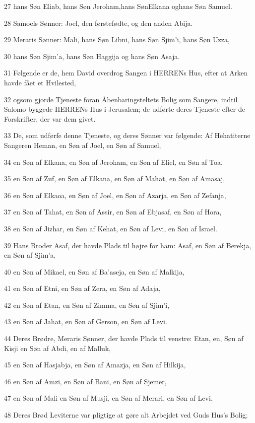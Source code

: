 \par 27 hans Søn Eliab, hans Søn Jeroham,hans SønElkana oghans Søn Samuel.
\par 28 Samoels Sønner: Joel, den førstefødte, og den anden Abija.
\par 29 Meraris Sønner: Mali, hans Søn Libni, hans Søn Sjim'i, hans Søn Uzza,
\par 30 hans Søn Sjim'a, hans Søn Haggija og hans Søn Asaja.
\par 31 Følgende er de, hem David overdrog Sangen i HERRENs Hus, efter at Arken havde fået et Hvilested,
\par 32 ogsom gjorde Tjeneste foran Åbenbaringsteltets Bolig som Sangere, indtil Salomo byggede HERRENs Hus i Jerusalem; de udførte deres Tjeneste efter de Forskrifter, der var dem givet.
\par 33 De, som udførfe denne Tjeneste, og deres Sønner var følgende: Af Hehatiterne Sangeren Heman, en Søn af Joel, en Søn af Samuel,
\par 34 en Søn af Elkana, en Søn af Jeroham, en Søn af Eliel, en Søn af Toa,
\par 35 en Søn af Zuf, en Søn af Elkana, en Søn af Mahat, en Søn af Amasaj,
\par 36 en Søn af Elkaoa, en Søn af Joel, en Søn af Azarja, en Søn af Zefanja,
\par 37 en Søn af Tahat, en Søn af Assir, en Søn af Ebjasaf, en Søn af Hora,
\par 38 en Søn af Jizhar, en Søn af Kehat, en Søn af Levi, en Søn af Israel.
\par 39 Hans Broder Asaf, der havde Plads til højre for ham: Asaf, en Søn af Berekja, en Søn af Sjim'a,
\par 40 en Søn af Mikael, en Søn af Ba'aseja, en Søn af Malkija,
\par 41 en Søn af Etni, en Søn af Zera, en Søn af Adaja,
\par 42 en Søn af Etan, en Søn af Zimma, en Søn af Sjim'i,
\par 43 en Søn af Jahat, en Søn af Gerson, en Søn af Levi.
\par 44 Deres Brødre, Meraris Sønner, der havde Plads til venstre: Etan, en, Søn af Kisji en Søn af Abdi, en af Malluk,
\par 45 en Søn af Hasjabja, en Søn af Amazja, en Søn af Hilkija,
\par 46 en Søn af Amzi, en Søn af Bani, en Søn af Sjemer,
\par 47 en Søn af Mali en Søn af Musji, en Søn af Merari, en Søn af Levi.
\par 48 Deres Brød Leviterne var pligtige at gøre alt Arbejdet ved Guds Hus's Bolig;
